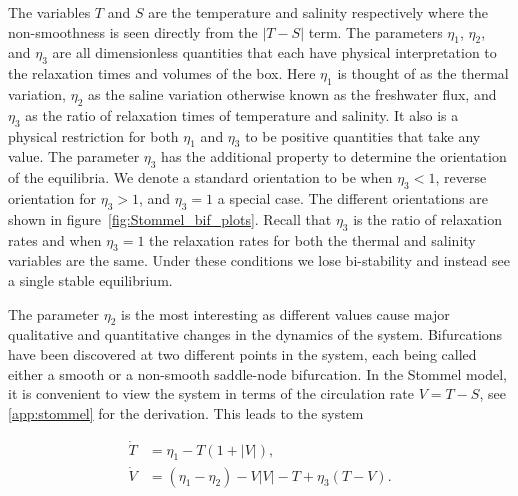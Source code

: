 The variables $T$ and $S$ are the temperature and salinity respectively where the non-smoothness is seen directly from the $|T-S|$ term. The parameters $\eta_1$, $\eta_2$, and $\eta_3$ are all dimensionless quantities that each have physical interpretation to the relaxation times and volumes of the box. Here $\eta_1$ is thought of as the thermal variation, $\eta_2$ as the saline variation otherwise known as the freshwater flux, and $\eta_3$ as the ratio of relaxation times of temperature and salinity. It also is a physical restriction for both $\eta_1$ and $\eta_3$ to be positive quantities that take any value. The parameter $\eta_3$ has the additional property to determine the orientation of the equilibria. We denote a standard orientation to be when $\eta_3<1$, reverse orientation for $\eta_3>1$, and $\eta_3=1$ a special case. The different orientations are shown in figure~\ref{fig:Stommel_bif_plots}. Recall that $\eta_3$ is the ratio of relaxation rates and when $\eta_3=1$ the relaxation rates for both the thermal and salinity variables are the same. Under these conditions we lose bi-stability and instead see a single stable equilibrium.

\indent The parameter $\eta_2$ is the most interesting as different values cause major qualitative and quantitative changes in the dynamics of the system. Bifurcations have been discovered at two different points in the system, each being called either a smooth or a non-smooth saddle-node bifurcation. In the Stommel model, it is convenient to view the system in terms of the circulation rate $V=T-S$, see \autoref{app:stommel} for the derivation. This leads to the system

\begin{equation}\label{eq:basic_stommel}
 \begin{aligned}
  \dot{T} & = \eta_1-T(1+|V|), \\
  \dot{V}   & = (\eta_1-\eta_2)-V|V|-T+\eta_3(T-V).
 \end{aligned}
\end{equation}

